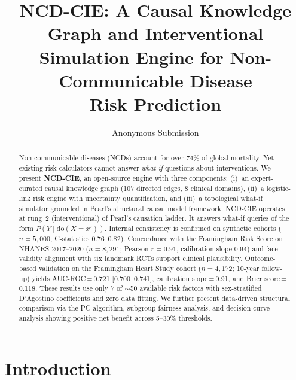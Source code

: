 \documentclass[runningheads]{llncs}
\begin{document}
\title{NCD-CIE: A Causal Knowledge Graph and Interventional\\Simulation Engine for Non-Communicable Disease\\Risk Prediction}

\author{Anonymous Submission}

\maketitle

\begin{abstract}
Non-communicable diseases (NCDs) account for over 74\% of global
mortality.
Yet existing risk calculators cannot answer \emph{what-if} questions
about interventions.
We present \textbf{NCD-CIE}, an open-source engine with three
components:
(i)~an expert-curated causal knowledge graph (107 directed edges,
8 clinical domains),
(ii)~a logistic-link risk engine with uncertainty quantification, and
(iii)~a topological what-if simulator grounded in Pearl's structural
causal model framework.
NCD-CIE operates at rung~2 (interventional) of Pearl's causation
ladder.
It answers what-if queries of the form
$P(Y \mid \mathrm{do}(X\!=\!x'))$.
Internal consistency is confirmed on synthetic cohorts
($n\!=\!5{,}000$; C-statistics 0.76--0.82).
Concordance with the Framingham Risk Score on NHANES 2017--2020
($n\!=\!8{,}291$; Pearson $r\!=\!0.91$, calibration slope 0.94)
and face-validity alignment with six landmark RCTs support clinical
plausibility.
Outcome-based validation on the Framingham Heart Study cohort
($n\!=\!4{,}172$; 10-year follow-up) yields
AUC-ROC\,=\,0.721 [0.700--0.741],
calibration slope\,=\,0.91, and Brier score\,=\,0.118.
These results use only 7 of ${\sim}$50 available risk factors
with sex-stratified D'Agostino coefficients and zero data fitting.
We further present data-driven structural comparison
via the PC algorithm, subgroup fairness analysis, and decision curve
analysis showing positive net benefit across 5--30\% thresholds.

\end{abstract}

\section{Introduction}\label{sec:intro}
\end{document}
